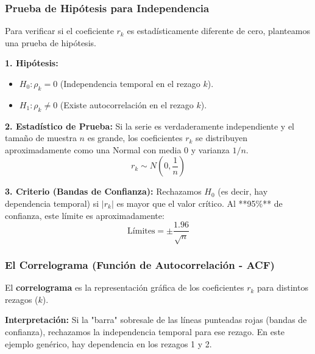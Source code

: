 \documentclass[aspectratio=1610, 10pt]{beamer}
\begin{document}
\begin{frame}
\frametitle{Prueba de Hipótesis para Independencia}
Para verificar si el coeficiente $r_k$ es estadísticamente diferente de cero, planteamos una prueba de hipótesis.

\vspace{0.2cm}
\textbf{1. Hipótesis:}
\begin{itemize}
    \item $H_0: \rho_k = 0$ (Independencia temporal en el rezago $k$).
    \item $H_1: \rho_k \neq 0$ (Existe autocorrelación en el rezago $k$).
\end{itemize}

\vspace{0.2cm}
\textbf{2. Estadístico de Prueba:}
Si la serie es verdaderamente independiente y el tamaño de muestra $n$ es grande, los coeficientes $r_k$ se distribuyen aproximadamente como una Normal con media $0$ y varianza $1/n$. 
$$r_k \sim N\left(0, \frac{1}{n}\right)$$

\textbf{3. Criterio (Bandas de Confianza):}
Rechazamos $H_0$ (es decir, hay dependencia temporal) si $|r_k|$ es mayor que el valor crítico. Al **95\%** de confianza, este límite es aproximadamente:
$$\text{Límites} = \pm \frac{1.96}{\sqrt{n}}$$
\end{frame}

\begin{frame}
\frametitle{El Correlograma (Función de Autocorrelación - ACF)}
El \textbf{correlograma} es la representación gráfica de los coeficientes $r_k$ para distintos rezagos ($k$). 

\begin{center}
\end{center}



\small
\textbf{Interpretación:} Si la "barra" sobresale de las líneas punteadas rojas (bandas de confianza), rechazamos la independencia temporal para ese rezago. En este ejemplo genérico, hay dependencia en los rezagos 1 y 2.
\end{frame}
\end{document}

